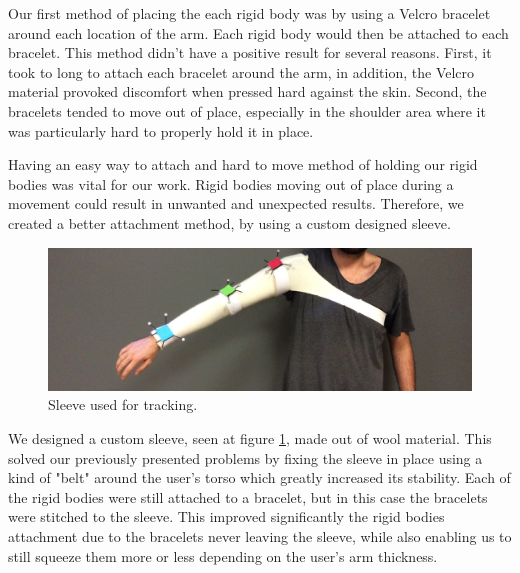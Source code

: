 Our first method of placing the each rigid body was by using a Velcro bracelet around each location of the arm. 
Each rigid body would then be attached to each bracelet. This method didn't have a positive result for several reasons. 
First, it took to long to attach each bracelet around the arm, in addition, the Velcro material provoked discomfort when pressed hard against the skin. 
Second, the bracelets tended to move out of place, especially in the shoulder area where it was particularly hard to properly hold it in place.

Having an easy way to attach and hard to move method of holding our rigid bodies was vital for our work. 
Rigid bodies moving out of place during a movement could result in unwanted and unexpected results. 
Therefore, we created a better attachment method, by using a custom designed sleeve.


\begin{figure}[!t]
    \begin{center}
        \includegraphics[width=\textwidth]{imgs/impl/sleevewearable.png}
    \end{center}
    \caption{Sleeve used for tracking.}
    \label{fig:sleevewearable}
\end{figure}

We designed a custom sleeve, seen at figure \ref{fig:sleevewearable}, made out of wool material. 
This solved our previously presented problems by fixing the sleeve in place using a kind of "belt" around the user's torso which greatly increased its stability. 
Each of the rigid bodies were still attached to a bracelet, but in this case the bracelets were stitched to the sleeve. 
This improved significantly the rigid bodies attachment due to the bracelets never leaving the sleeve, 
while also enabling us to still squeeze them more or less depending on the user's arm thickness.

